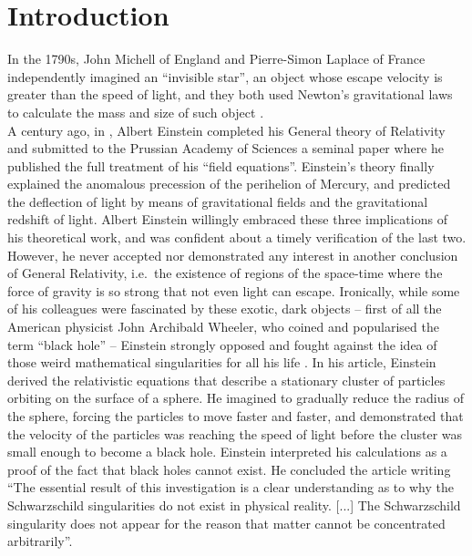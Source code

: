 \chapter{Introduction}
\label{ch:intro}
In the 1790s, John Michell of England and Pierre-Simon Laplace of France 
independently imagined an ``invisible star'', 
an object whose escape velocity is greater than the speed of light, 
and they both used Newton's gravitational laws to calculate the mass and size of such object \citep{montgomery2009}.  \\

A century ago, in \citeyear{einstein1915}, Albert Einstein completed his General theory of Relativity 
and submitted to the Prussian Academy of Sciences a seminal paper 
where he published the full treatment of his ``field equations''. 
Einstein's theory finally explained the anomalous precession of the perihelion of Mercury, 
and predicted the deflection of light by means of gravitational fields 
and the gravitational redshift of light. 
Albert Einstein willingly embraced these three implications of his theoretical work, 
and was confident about a timely verification of the last two. 
However, he never accepted nor demonstrated any interest in another conclusion of General Relativity, 
i.e.~the existence of regions of the space-time where the force of gravity is so strong 
that not even light can escape. 
Ironically, while some of his colleagues were fascinated by these exotic, dark objects -- 
first of all the American physicist John Archibald Wheeler, who coined and popularised the term ``black hole'' -- 
Einstein strongly opposed and fought against the idea of those weird mathematical singularities for all his life 
\citep{thorne1994}. 
In his \citeyear{einstein1939} article, 
Einstein derived the relativistic equations that describe a stationary cluster of particles 
orbiting on the surface of a sphere. 
He imagined to gradually reduce the radius of the sphere, 
forcing the particles to move faster and faster, 
and demonstrated that the velocity of the particles was reaching the speed of light 
before the cluster was small enough to become a black hole. 
Einstein interpreted his calculations as a proof of the fact that black holes cannot exist. 
He concluded the article writing ``The essential result of this investigation is a clear understanding as to why 
the Schwarzschild singularities do not exist in physical reality. [...] 
The Schwarzschild singularity does not appear for the reason that matter cannot be concentrated arbitrarily''.  \\

